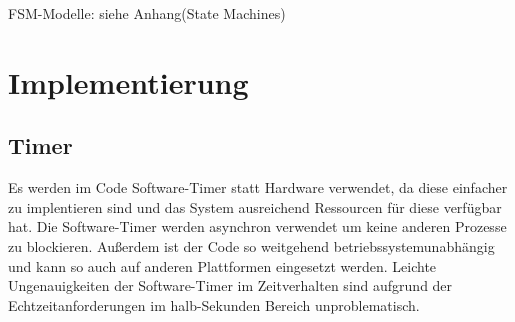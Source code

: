 \documentclass[
   draft=false
  ,paper=a4
  ,twoside=true
  ,fontsize=11pt
  ,headsepline
  ,DIV11
  ,parskip=full+
]{scrartcl} %
\begin{document}
FSM-Modelle: siehe Anhang(State Machines)

\newpage
\section{Implementierung}
\subsection{Timer}
Es werden im Code Software-Timer statt Hardware verwendet, da diese einfacher zu implentieren sind und das System ausreichend Ressourcen für diese verfügbar hat. Die Software-Timer werden asynchron verwendet um keine anderen Prozesse zu blockieren. Außerdem ist der Code so weitgehend betriebssystemunabhängig und kann so auch auf anderen Plattformen eingesetzt werden. Leichte Ungenauigkeiten der Software-Timer im Zeitverhalten sind aufgrund der Echtzeitanforderungen im halb-Sekunden Bereich unproblematisch.
\end{document}

